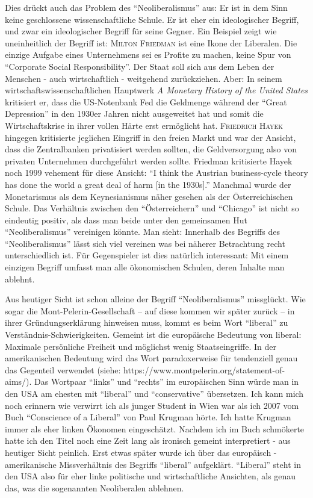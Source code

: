Dies drückt auch das Problem des "`Neoliberalismus"' aus: Er ist in dem Sinn keine geschlossene wissenschaftliche Schule. Er ist eher ein ideologischer Begriff, und zwar ein ideologischer Begriff für seine Gegner.
Ein Beispiel zeigt wie uneinheitlich der Begriff ist: \textsc{Milton Friedman} ist eine Ikone der Liberalen. Die einzige Aufgabe eines Unternehmens sei es Profite zu machen, keine Spur von "`Corporate Social Responsibility"'. Der Staat soll sich aus dem Leben der Menschen - auch wirtschaftlich - weitgehend zurückziehen. Aber: In seinem wirtschaftswissenschaftlichen Hauptwerk \textit{A Monetary History of the United States} \parencite{Friedman1962} kritisiert er, dass die US-Notenbank Fed die Geldmenge während der "`Great Depression"' in den 1930er Jahren nicht ausgeweitet hat und somit die Wirtschaftskrise in ihrer vollen Härte erst ermöglicht hat.
\textsc{Friedrich Hayek} hingegen kritisierte jeglichen Eingriff in den freien Markt und war der Ansicht, dass die Zentralbanken privatisiert werden sollten, die Geldversorgung also von privaten Unternehmen durchgeführt werden sollte. Friedman kritisierte Hayek noch 1999 vehement für diese Ansicht: "`I think the Austrian business-cycle theory has done the world a great deal of harm [in the 1930s]."' \parencite{Epstein1999} Manchmal wurde der Monetarismus als dem Keynesianismus näher gesehen als der Österreichischen Schule. Das Verhältnis zwischen den "`Österreichern"' und "`Chicago"'\parencite{Skousen2005} ist nicht so eindeutig positiv, als dass man beide unter den gemeinsamen Hut "`Neoliberalismus"' vereinigen könnte. Man sieht: Innerhalb des Begriffs des "`Neoliberalismus"' lässt sich viel vereinen was bei näherer Betrachtung recht unterschiedlich ist. Für Gegenspieler ist dies natürlich interessant: Mit einem einzigen Begriff umfasst man alle ökonomischen Schulen, deren Inhalte man ablehnt.


Aus heutiger Sicht ist schon alleine der Begriff "`Neoliberalismus"' missglückt. Wie sogar die Mont-Pelerin-Gesellschaft -- auf diese kommen wir später zurück -- in ihrer Gründungserklärung hinweisen muss, kommt es beim Wort "`liberal"' zu Verständnis-Schwierigkeiten. Gemeint ist die europäische Bedeutung von liberal: Maximale persönliche Freiheit und möglichst wenig Staatseingriffe. In der amerikanischen Bedeutung wird das Wort paradoxerweise für tendenziell genau das Gegenteil verwendet (siehe: https://www.montpelerin.org/statement-of-aims/). Das Wortpaar "`links"' und "`rechts"' im europäischen Sinn würde man in den USA am ehesten mit "`liberal"' und "`conservative"' übersetzen. Ich kann mich noch erinnern wie verwirrt ich als junger Student in Wien war als ich 2007 vom Buch "`Conscience of a Liberal"' von Paul Krugman hörte. Ich hatte Krugman immer als eher linken Ökonomen eingeschätzt. Nachdem ich im Buch schmökerte hatte ich den Titel noch eine Zeit lang als ironisch gemeint interpretiert - aus heutiger Sicht peinlich. Erst etwas später wurde ich über das europäisch - amerikanische Missverhältnis des Begriffs "`liberal"' aufgeklärt. "`Liberal"' steht in den USA also für eher linke politische und wirtschaftliche Ansichten, als genau das, was die sogenannten Neoliberalen ablehnen.

